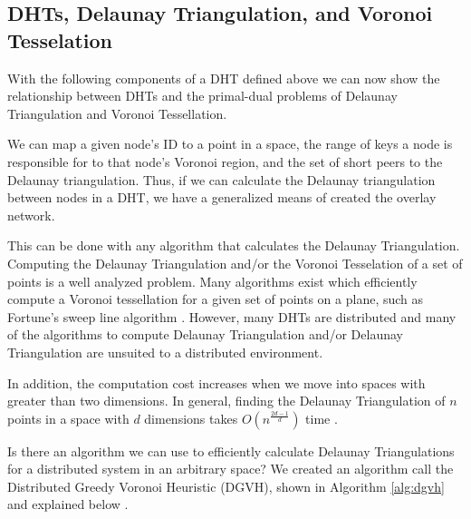 \documentclass[11pt,conference]{IEEEtran}
\begin{document}
\subsection{DHTs, Delaunay Triangulation, and Voronoi Tesselation}
With the following components of a DHT defined above we can now show the relationship between DHTs and the primal-dual problems of Delaunay Triangulation and Voronoi Tessellation.

We can map a given node's ID to a point in a space, the range of keys a node is responsible for to that node's Voronoi region, and the set of short peers to the Delaunay triangulation.
Thus, if we can calculate the Delaunay triangulation between nodes in a DHT, we have a generalized means of created the overlay network.

This can be done with any algorithm that calculates the Delaunay Triangulation.
Computing the Delaunay Triangulation and/or the Voronoi Tesselation of a set of points is a well analyzed problem.
Many algorithms exist which efficiently compute a Voronoi tessellation for a given set of points on a plane, such as Fortune's sweep line algorithm \cite{fortune1987sweepline}.
However, many DHTs are distributed and many of the algorithms to compute Delaunay Triangulation and/or Delaunay Triangulation are unsuited to a distributed environment.

In addition, the computation cost increases when we move into spaces with greater than two dimensions.
In general, finding the Delaunay Triangulation of $n$ points in a space with $d$ dimensions takes $O(n^{\frac{2d-1}{d}})$ time \cite{watson1981computing}.


Is there an algorithm we can use to efficiently calculate Delaunay Triangulations for a distributed system in an arbitrary space?
We created an algorithm call the Distributed Greedy Voronoi Heuristic (DGVH), shown in Algorithm \ref{alg:dgvh} and explained below \cite{dgvh}.
\end{document}
